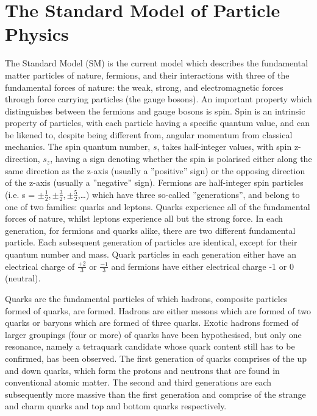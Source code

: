 \section{The Standard Model of Particle Physics}\label{sec:sm}

The Standard Model (SM) is the current model which describes the fundamental matter particles of nature, fermions, and their interactions with three of the fundamental forces of nature: the weak, strong, and electromagnetic forces through force carrying particles (the gauge bosons)\cite{LagrangiansSM}.
An important property which distinguishes between the fermions and gauge bosons is spin. 
Spin is an intrinsic property of particles, with each particle having a specific quantum value, and can be likened to, despite being different from, angular momentum from classical mechanics\cite{QM}. 
The spin quantum number, $s$,  takes half-integer values, with spin z-direction, $s_{z}$, having a sign denoting whether the spin is polarised either along the same direction as the z-axis (usually a ''positive'' sign) or the opposing direction of the z-axis (usually a ''negative'' sign)\cite{QM}. 
Fermions are half-integer spin particles (i.e. s = $\pm\frac{1}{2}, \pm\frac{3}{2},\pm\frac{5}{2}$,…) which have three so-called ''generations'', and belong to one of two families: quarks and leptons\cite{ElectroweakStrong}. 
Quarks experience all of the fundamental forces of nature, whilst leptons experience all but the strong force\cite{LagrangiansSM}. 
In each generation, for fermions and quarks alike, there are two different fundamental particle\cite{LagrangiansSM}. 
Each subsequent generation of particles are identical, except for their quantum number and mass. 
Quark particles in each generation either have an electrical charge of $\frac{+2}{3}$ or $\frac{-1}{3}$ and fermions have either electrical charge -1 or 0 (neutral)\cite{ElectroweakStrong}. 

Quarks are the fundamental particles of which hadrons, composite particles formed of quarks, are formed. 
Hadrons are either mesons which are formed of two quarks or baryons which are formed of three quarks. 
Exotic hadrons formed of larger groupings (four or more) of quarks have been hypothesised, but only one resonance, namely a tetraquark candidate whose quark content still has to be confirmed, has been observed\cite{PhysRevLett.112.222002}. 
The first generation of quarks comprises of the up and down quarks, which form the protons and neutrons that are found in conventional atomic matter. 
The second and third generations are each subsequently more massive than the first generation and comprise of the strange and charm quarks and top and bottom quarks respectively. 


